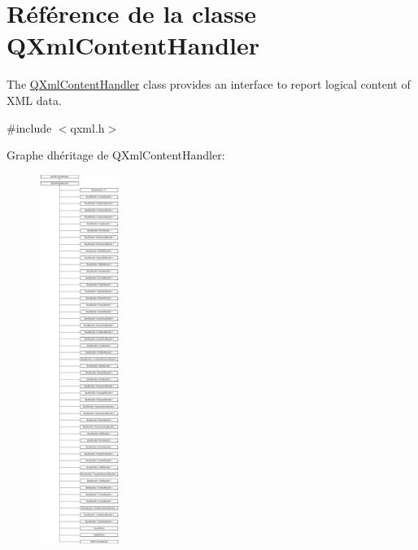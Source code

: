 \hypertarget{class_q_xml_content_handler}{}\section{Référence de la classe Q\+Xml\+Content\+Handler}
\label{class_q_xml_content_handler}


The \hyperlink{class_q_xml_content_handler}{Q\+Xml\+Content\+Handler} class provides an interface to report logical content of X\+M\+L data.  




{\ttfamily \#include $<$qxml.\+h$>$}

Graphe d\textquotesingle{}héritage de Q\+Xml\+Content\+Handler\+:\begin{figure}[H]
\begin{center}
\leavevmode
\includegraphics[height=12.000000cm]{class_q_xml_content_handler}
\end{center}
\end{figure}
